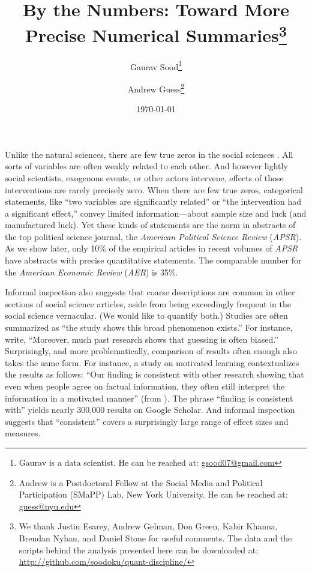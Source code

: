 \documentclass[12pt]{article}
\begin{document}
\title{\vspace{-.5cm}\large{\textbf{By the Numbers: Toward More Precise Numerical Summaries}}\footnote{We thank Justin Esarey, Andrew Gelman, Don Green, Kabir Khanna, Brendan Nyhan, and Daniel Stone for useful comments. The data and the scripts behind the analysis presented here can be downloaded at: \url{http://github.com/soodoku/quant-discipline/}}\vspace{.5cm}}
\author{Gaurav Sood\footnote{Gaurav is a data scientist. He can be reached at: \href{mailto:gsood07@gmail.com}{\small{gsood07@gmail.com}}} \and Andrew Guess\footnote{Andrew is a Postdoctoral Fellow  at the Social Media and Political Participation (SMaPP) Lab, New York University. He can be reached at: \href{mailto:guess@nyu.edu}{\small{guess@nyu.edu}}}}
\date{\vspace{.5cm}\normalsize{\today}} 
\maketitle
\doublespacing

Unlike the natural sciences, there are few true zeros in the social sciences \citep[p. 960,][]{gelman2011causality}. All sorts of variables are often weakly related to each other. And however lightly social scientists, exogenous events, or other actors intervene, effects of those interventions are rarely precisely zero. When there are few true zeros, categorical statements, like ``two variables are significantly related'' or ``the intervention had a significant effect,'' convey limited information---about sample size and luck (and manufactured luck). Yet these kinds of statements are the norm in abstracts of the top political science journal, the \emph{American Political Science Review} (\emph{APSR}).  As we show later, only 10\% of the empirical articles in recent volumes of \emph{APSR} have abstracts with precise quantitative statements. The comparable number for the \emph{American Economic Review} (\emph{AER}) is 35\%.

Informal inspection also suggests that coarse descriptions are common in other sections of social science articles, aside from being exceedingly frequent in the social science vernacular. (We would like to quantify both.) Studies are often summarized as ``the study shows this broad phenomenon exists.'' For instance, \citet{pasek2015} write, ``Moreover, much past research shows that guessing is often biased.'' Surprisingly, and more problematically, comparison of results often enough also takes the same form. For instance, a study on motivated learning contextualizes the results as follows: ``Our finding is consistent with other research showing that even when people agree on factual information, they often still interpret the information in a motivated manner'' (from \citealt{khanna2015}). The phrase ``finding is consistent with'' yields nearly 300,000 results on Google Scholar. And informal inspection suggests that ``consistent'' covers a surprisingly large range of effect sizes and measures.    
\end{document}
